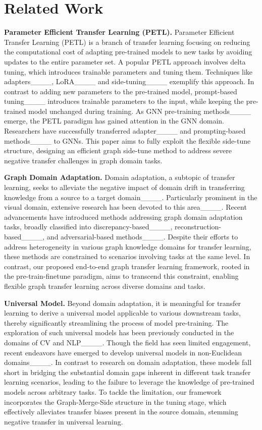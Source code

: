 \section{Related Work}
\textbf{Parameter Efficient Transfer Learning (PETL).} Parameter Efficient Transfer Learning (PETL) is a branch of transfer learning focusing on reducing the computational cost of adapting pre-trained models to new tasks by avoiding updates to the entire parameter set.
A popular PETL approach involves delta tuning, which introduces trainable parameters and tuning them. Techniques like adapters____, LoRA____ and side-tuning____ exemplify this approach. In contrast to adding new parameters to the pre-trained model, prompt-based tuning____ introduces trainable parameters to the input, while keeping the pre-trained model unchanged during training. As GNN pre-training methods____ emerge, the PETL paradigm has gained attention in the GNN domain. Researchers have successfully transferred adapter____ and prompting-based methods____ to GNNs. This paper aims to fully exploit the flexible side-tune structure, designing an efficient graph side-tune method to address severe negative transfer challenges in graph domain tasks.

\noindent \textbf{Graph Domain Adaptation.} Domain adaptation, a subtopic of transfer learning, seeks to alleviate the negative impact of domain drift in transferring knowledge from a source to a target domain____. Particularly prominent in the visual domain, extensive research has been devoted to this area____. Recent advancements have introduced methods addressing graph domain adaptation tasks, broadly classified into discrepancy-based____, reconstruction-based____, and adversarial-based methods____. Despite their efforts to address heterogeneity in various graph knowledge domains for transfer learning, these methods are constrained to scenarios involving tasks at the same level. In contrast, our proposed end-to-end graph transfer learning framework, rooted in the pre-train-finetune paradigm, aims to transcend this constraint, enabling flexible graph transfer learning across diverse domains and tasks.


\noindent \textbf{Universal Model.} Beyond domain adaptation, it is meaningful for transfer learning to derive a universal model applicable to various downstream tasks, thereby significantly streamlining the process of model pre-training. The exploration of such universal models has been previously conducted in the domains of CV and NLP____. Though the field has seen limited engagement, recent endeavors have emerged to develop universal models in non-Euclidean domains____. In contrast to research on domain adaptation, these models fall short in bridging the substantial domain gaps inherent in different task transfer learning scenarios, leading to the failure to leverage the knowledge of pre-trained models across arbitrary tasks. To tackle the limitation, our framework incorporates the Graph-Merge-Side structure in the tuning stage, which effectively alleviates transfer biases present in the source domain, stemming negative transfer in universal learning.